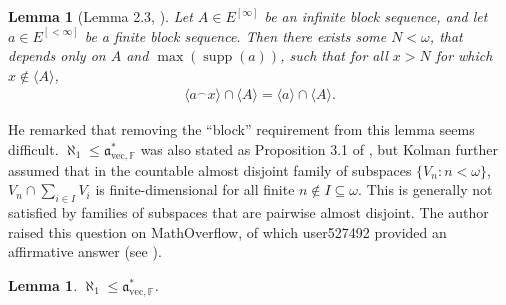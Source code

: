 \documentclass[11pt,reqno]{amsart}
\theoremstyle{plain}
\numberwithin{equation}{section}
\newtheorem{lemma}[theorem]{Lemma}
\theoremstyle{definition}
\newcommand{\func}{\operatorname}
\renewcommand{\c}[1]{\langle #1 \rangle}
\renewcommand{\frak}{\mathfrak}
\newcommand{\supp}{\func{supp}}
\newcommand{\avec}{\frak{a}_{\mathrm{vec},\mathbb{F}}}
\begin{document}
\begin{lemma}[Lemma 2.3, \cite{S19}]
\label{lem:iteration.lemma.for.subspaces}
    Let $A \in E^{[\infty]}$ be an infinite block sequence, and let $a \in E^{[<\infty]}$ be a finite block sequence. Then there exists some $N < \omega$, that depends only on $A$ and $\max(\supp(a))$, such that for all $x > N$ for which $x \notin \c{A}$, 
    \begin{align*}
        \c{a^\frown x} \cap \c{A} = \c{a} \cap \c{A}.
    \end{align*}
\end{lemma}

He remarked that removing the ``block'' requirement from this lemma seems difficult. $\aleph_1 \leq \avec^*$ was also stated as Proposition 3.1 of \cite{K00}, but Kolman further assumed that in the countable almost disjoint family of subspaces $\{V_n : n < \omega\}$, $V_n \cap \sum_{i \in I} V_i$ is finite-dimensional for all finite $n \notin I \subseteq \omega$. This is generally not satisfied by families of subspaces that are pairwise almost disjoint. The author raised this question on MathOverflow, of which user527492 provided an affirmative answer (see \cite{u25}). 

\begin{lemma}
\label{lem:avec*.geq.aleph_1}
     $\aleph_1 \leq \avec^*$.
\end{lemma}
\end{document}
